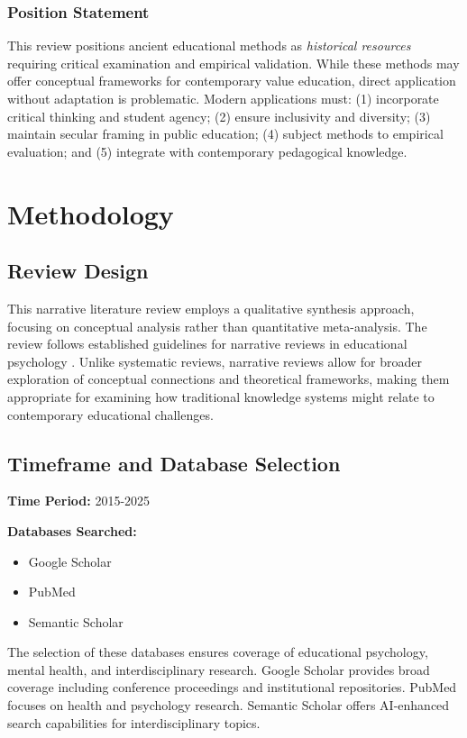 \documentclass[12pt,a4paper,twocolumn]{article}
\begin{document}
\subsubsection{Position Statement}

This review positions ancient educational methods as \textit{historical resources} requiring critical examination and empirical validation. While these methods may offer conceptual frameworks for contemporary value education, direct application without adaptation is problematic. Modern applications must: (1) incorporate critical thinking and student agency; (2) ensure inclusivity and diversity; (3) maintain secular framing in public education; (4) subject methods to empirical evaluation; and (5) integrate with contemporary pedagogical knowledge.

\section{Methodology}

\subsection{Review Design}

This narrative literature review employs a qualitative synthesis approach, focusing on conceptual analysis rather than quantitative meta-analysis. The review follows established guidelines for narrative reviews in educational psychology \citep{Green2001}. Unlike systematic reviews, narrative reviews allow for broader exploration of conceptual connections and theoretical frameworks, making them appropriate for examining how traditional knowledge systems might relate to contemporary educational challenges.

\subsection{Timeframe and Database Selection}

\textbf{Time Period:} 2015-2025

\textbf{Databases Searched:}
\begin{itemize}
    \item Google Scholar
    \item PubMed
    \item Semantic Scholar
\end{itemize}

The selection of these databases ensures coverage of educational psychology, mental health, and interdisciplinary research. Google Scholar provides broad coverage including conference proceedings and institutional repositories. PubMed focuses on health and psychology research. Semantic Scholar offers AI-enhanced search capabilities for interdisciplinary topics.
\end{document}
